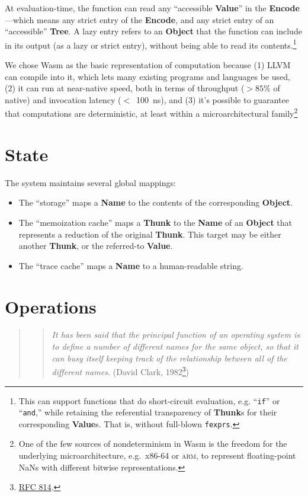 \documentclass{article}
\newcommand{\valuex}{\textbf{Value}\xspace}
\newcommand{\valuexs}{\textbf{Value}s\xspace}
\newcommand{\object}{\textbf{Object}\xspace}
\newcommand{\encode}{\textbf{Encode}\xspace}
\newcommand{\thunk}{\textbf{Thunk}\xspace}
\newcommand{\thunks}{\textbf{Thunk}s\xspace}
\newcommand{\name}{\textbf{Name}\xspace}
\newcommand{\tree}{\textbf{Tree}\xspace}
\newcommand{\bs}{\vspace{\baselineskip}}
\begin{document}
At evaluation-time, the function can read any ``accessible \valuex'' in
the \encode---which means any strict entry of the \encode, and any
strict entry of an ``accessible'' \tree. A lazy entry refers to an
\object that the function can include in its output (as a lazy or
strict entry), without being able to read its contents.\footnote{This
can support functions that do short-circuit evaluation,
e.g. ``\texttt{if}'' or ``\texttt{and},'' while retaining the
referential transparency of \thunks for their corresponding
\valuexs. That is, without full-blown \texttt{fexprs}.}

\bs

We chose Wasm as the basic representation of computation because (1)
LLVM can compile into it, which lets many existing programs and
languages be used, (2) it can run at near-native speed, both in terms
of throughput ($>85\%$ of native) and invocation latency ($<$~100~ns),
and (3) it's possible to guarantee that computations are
deterministic, at least within a microarchitectural
family\footnote{One of the few sources of nondeterminism in Wasm is
the freedom for the underlying microarchitecture, e.g.~x86-64 or \textsc{arm}, to represent floating-point NaNs
with different bitwise representations.}

\section{State}

The system maintains several global mappings:
\begin{itemize}[itemsep=0pt]
\item The ``storage'' maps a \name to the contents of the corresponding \object.

\item The ``memoization cache'' maps a \thunk to the \name of an \object that represents
  a reduction of the original \thunk. This target may be either another \thunk, or the referred-to \valuex.

\item The ``trace cache'' maps a \name to a human-readable string.
\end{itemize}

\section{Operations}

\begin{quote}
\begin{quote}
\textit{It has been said that the principal function of an operating system
is to define a number of different names for the same object, so that it
can  busy  itself  keeping  track of the relationship between all of the
different names.} (David Clark, 1982\footnote{\href{https://www.rfc-editor.org/rfc/rfc814.html}{RFC 814}.})
\end{quote}
\end{quote}
\end{document}
